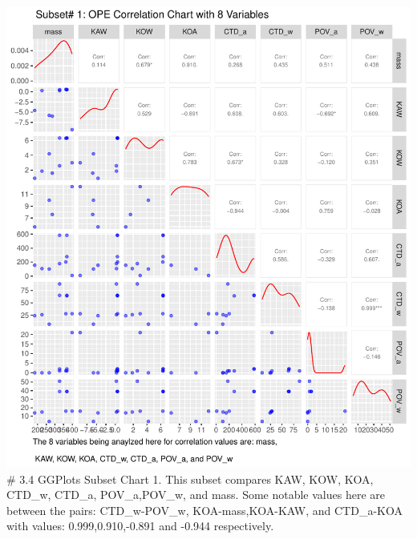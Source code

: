\documentclass[journal=jacsat,manuscript=article]{achemso}
\begin{document}
\includegraphics{Rahmi_Chowdhury_500621744_Final_project_files/figure-latex/unnamed-chunk-5-1.pdf}
\# 3.4 GGPlots Subset Chart 1. This subset compares KAW, KOW, KOA,
CTD\_w, CTD\_a, POV\_a,POV\_w, and mass. Some notable values here are
between the pairs: CTD\_w-POV\_w, KOA-mass,KOA-KAW, and CTD\_a-KOA with
values: 0.999,0.910,-0.891 and -0.944 respectively.
\end{document}
